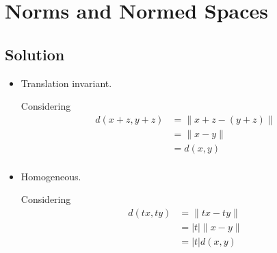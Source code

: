 \documentclass{article}
\begin{document}
\section{Norms and Normed Spaces}

\subsection{Solution}
\begin{itemize}
    \item Translation invariant.
    
    Considering
    \begin{align*}
        d(x + z, y + z) &= \|x + z - (y + z)\|\\
        &= \|x - y\|\\
        &= d(x, y)\\
    \end{align*}

    \item Homogeneous.
    
    Considering
    \begin{align*}
        d(tx, ty) &= \|tx - ty\|\\
        &= |t|\|x - y\|\\
        &= |t|d(x, y)\\
    \end{align*}
\end{itemize}

\subsection{}

\subsection{}

\subsection{}

\end{document}

